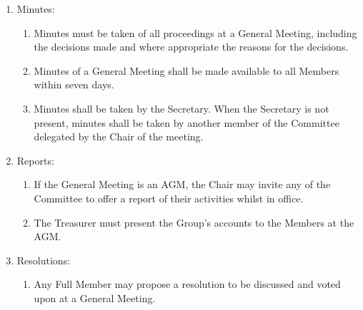 \documentclass[12pt]{constitution}
\begin{document}
\begin{enumerate}
    \item Minutes:
    \begin{enumerate}
        \item Minutes must be taken of all proceedings at a General Meeting, including the decisions made and where appropriate the reasons for the decisions.
        \item Minutes of a General Meeting shall be made available to all Members within seven days.
        \item Minutes shall be taken by the Secretary. When the Secretary is not present, minutes shall be taken by another member of the Committee delegated by the Chair of the meeting.
    \end{enumerate}

    \item Reports:
    \begin{enumerate}
        \item If the General Meeting is an AGM, the Chair may invite any of the Committee to offer a report of their activities whilst in office.
        \item The Treasurer must present the Group's accounts to the Members at the AGM.
    \end{enumerate}

    \item Resolutions:
    \begin{enumerate}
        \item Any Full Member may propose a resolution to be discussed and voted upon at a General Meeting.
    \end{enumerate}
\end{enumerate}


\label{clause:officers-committee}
\end{document}
